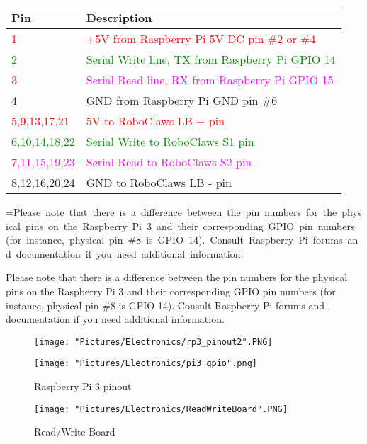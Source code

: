 \documentclass[12pt]{article}
\makeatletter
\newcommand{\mybox}[1]{%
  \setbox0=\hbox{#1}%
  \setlength{\@tempdima}{\dimexpr\wd0+13pt}%
  \begin{tcolorbox}[colframe=mycolor,boxrule=0.5pt,arc=4pt,
      left=6pt,right=6pt,top=6pt,bottom=6pt,boxsep=0pt,width=0.95\textwidth]
    #1
  \end{tcolorbox}
}
\makeatother
\begin{document}
\begin{tabular}[2] {| p{2.5cm} | p{11cm} |}
	\hline
	\textbf{Pin} & \textbf{Description} \\ \hline
	\textcolor{red}{1} & \textcolor{red}{+5V from Raspberry Pi 5V DC pin \#2 or \#4} \\ \hline
	\textcolor{green}{2} & \textcolor{green}{Serial Write line, TX from Raspberry Pi GPIO 14} \\ \hline
	\textcolor{magenta}{3} & \textcolor{magenta}{Serial Read line, RX from Raspberry Pi GPIO 15}	\\ \hline
	4 & GND from Raspberry Pi GND pin \#6 \\ \hline
	\textcolor{red}{5,9,13,17,21} & \textcolor{red}{5V to RoboClaws LB + pin} \\ \hline
	\textcolor{green}{6,10,14,18,22} & \textcolor{green}{Serial Write to RoboClaws S1 pin} \\ \hline
	\textcolor{magenta}{7,11,15,19,23} & \textcolor{magenta}{Serial Read to RoboClaws S2 pin} \\ \hline
	8,12,16,20,24 & GND to RoboClaws LB - pin \\ \hline 
\end{tabular}

\bigskip 

\mybox{Please note that there is a difference between the pin numbers for the physical pins on the Raspberry Pi 3 and their  corresponding GPIO pin numbers (for instance, physical pin \#8 is GPIO 14). Consult Raspberry Pi forums and documentation if you need additional information.}


\begin{figure}[H]
 	\centering
  	\begin{minipage}[b]{0.35\textwidth}
		\texttt{[image: "Pictures/Electronics/rp3\_pinout2".PNG]}
  	\end{minipage}
  	\hfill
  	\begin{minipage}[b]{0.45\textwidth}
    		\texttt{[image: "Pictures/Electronics/pi3\_gpio".png]}
  	\end{minipage}
	\caption{Raspberry Pi 3 pinout}
	\label{RPi 3 pinout}
\end{figure}

\begin{figure}[H]
 	\centering
	\texttt{[image: "Pictures/Electronics/ReadWriteBoard".PNG]}
 	\caption{Read/Write Board}
	\label{Read/Write Board}
\end{figure}
\end{document}
